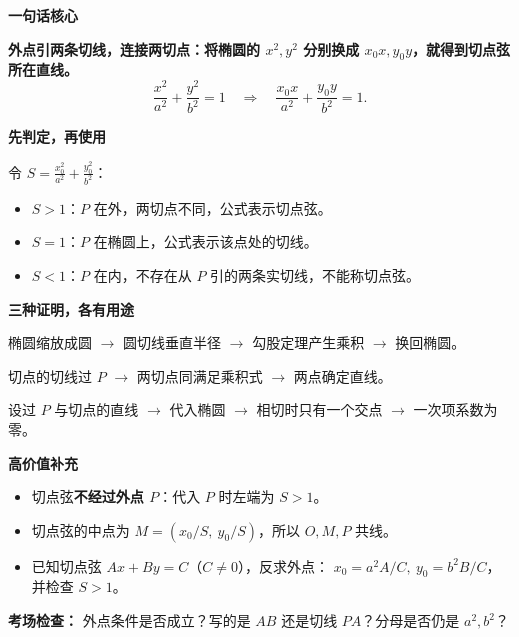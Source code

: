 \clearpage
\begin{summarybox}
    \textbf{\textcolor{CSummary}{一句话核心}}

    \textbf{外点引两条切线，连接两切点：将椭圆的 $x^2,y^2$ 分别换成 $x_0x,y_0y$，就得到切点弦所在直线。}
    \[
        \frac{x^2}{a^2}+\frac{y^2}{b^2}=1
        \quad\Longrightarrow\quad
        \boxed{\frac{x_0x}{a^2}+\frac{y_0y}{b^2}=1}.
    \]

    \medskip
    \textbf{\textcolor{CSummary}{先判定，再使用}}

    令 $S=\frac{x_0^2}{a^2}+\frac{y_0^2}{b^2}$：
    \begin{itemize}[leftmargin=*, itemsep=0.2em]
        \item $S>1$：$P$ 在外，两切点不同，公式表示切点弦。
        \item $S=1$：$P$ 在椭圆上，公式表示该点处的切线。
        \item $S<1$：$P$ 在内，不存在从 $P$ 引的两条实切线，不能称切点弦。
    \end{itemize}

    \medskip
    \textbf{\textcolor{CSummary}{三种证明，各有用途}}
    \begin{description}[style=nextline, leftmargin=2.8em, labelsep=0.5em, itemsep=0.25em]
        \item[\textbf{(1) 门槛最低：}] 椭圆缩放成圆 $\rightarrow$ 圆切线垂直半径 $\rightarrow$ 勾股定理产生乘积 $\rightarrow$ 换回椭圆。
        \item[\textbf{(2) 最快：}] 切点的切线过 $P$ $\rightarrow$ 两切点同满足乘积式 $\rightarrow$ 两点确定直线。
        \item[\textbf{(3) 常规通用：}] 设过 $P$ 与切点的直线 $\rightarrow$ 代入椭圆 $\rightarrow$ 相切时只有一个交点 $\rightarrow$ 一次项系数为零。
    \end{description}

    \medskip
    \textbf{\textcolor{CSummary}{高价值补充}}
    \begin{itemize}[leftmargin=*, itemsep=0.25em]
        \item 切点弦\textbf{不经过外点 $P$}：代入 $P$ 时左端为 $S>1$。
        \item 切点弦的中点为 $\boxed{M=(x_0/S,\ y_0/S)}$，所以 $O,M,P$ 共线。
        \item 已知切点弦 $Ax+By=C$（$C\ne0$），反求外点：
        $\boxed{x_0=a^2A/C,\ y_0=b^2B/C}$，并检查 $S>1$。
    \end{itemize}

    \textbf{考场检查：} 外点条件是否成立？写的是 $AB$ 还是切线 $PA$？分母是否仍是 $a^2,b^2$？
\end{summarybox}
